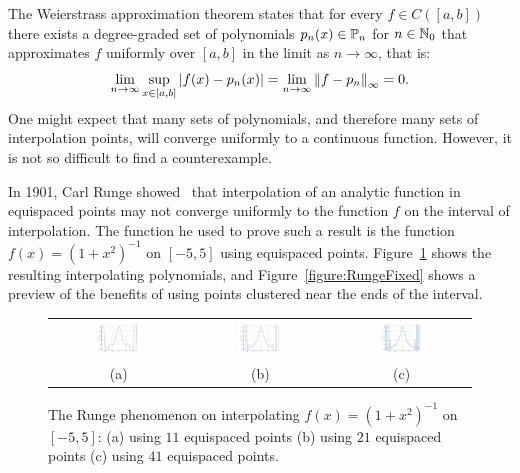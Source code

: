 The Weierstrass approximation theorem states that for every $f\in C([a,b])$ there exists a degree-graded set of polynomials $p_n(x)\in\P_n$ for $n\in\N_0$ that approximates $f$ uniformly over $[a,b]$ in the limit as $n\to\infty$, that is:
\begin{equation}
\lim_{n\to\infty}\sup_{x\in[a,b]}\abs{f(x)-p_n(x)} = \lim_{n\to\infty}\norm{f-p_n}_\infty = 0.
\end{equation}
One might expect that many sets of polynomials, and therefore many sets of interpolation points, will converge uniformly to a continuous function. However, it is not so difficult to find a counterexample.

In 1901, Carl Runge showed~\cite{Runge-46-224-01} that interpolation of an analytic function in equispaced points may not converge uniformly to the function $f$ on the interval of interpolation. The function he used to prove such a result is the function $f(x) = (1+x^2)^{-1}$ on $[-5,5]$ using equispaced points. Figure~\ref{figure:Runge} shows the resulting interpolating polynomials, and Figure~\ref{figure:RungeFixed} shows a preview of the benefits of using points clustered near the ends of the interval.

\begin{figure}[htbp]
\begin{center}
\begin{tabular}{ccc}
\hspace*{-0.5cm}\includegraphics[width=0.35\textwidth]{runge1}&
\hspace*{-0.5cm}\includegraphics[width=0.35\textwidth]{runge2}&
\hspace*{-0.5cm}\includegraphics[width=0.35\textwidth]{runge3}\\
(a) & (b) & (c)\\
\end{tabular}
\caption{The Runge phenomenon on interpolating $f(x) = (1+x^2)^{-1}$ on $[-5,5]$: (a) using $11$ equispaced points (b) using $21$ equispaced points (c) using $41$ equispaced points.}
\label{figure:Runge}
\end{center}
\end{figure}

